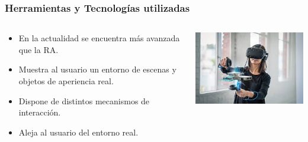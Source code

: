 \begin{frame}
	\frametitle{Herramientas y Tecnologías utilizadas}
	\begin{columns}
			\begin{column}{0.6\textwidth}
					\begin{itemize}
						\item {En la actualidad se encuentra más avanzada que la RA.}
						\item {Muestra al usuario un entorno de escenas y objetos de aperiencia real.}
						\item {Dispone de distintos mecanismos de interacción.}
						\item {Aleja al usuario del entorno real.}
					\end{itemize}
				\endblock{}
			\end{column}
			\begin{column}{0.4\textwidth}
				\vfill 
					\begin{center}
						\includegraphics[width=0.95\linewidth]{Images/rvimage}
					\end{center}
			\end{column}
	\end{columns}
\end{frame}



